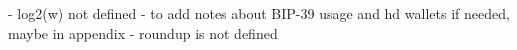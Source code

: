 - log2(w) not defined
- to add notes about BIP-39 usage and hd wallets if needed, maybe in appendix
- roundup is not defined